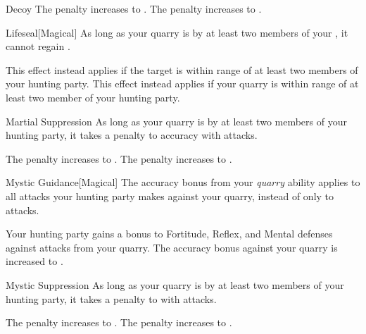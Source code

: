 {\begin{freeability}{Decoy}
                \rankline
                 The penalty increases to .
                 The penalty increases to .
            \end{freeability}

            \begin{freeability}{Lifeseal}[Magical]
                As long as your quarry is  by at least two members of your , it cannot regain .

                \rankline
                 This effect instead applies if the target is within \rngmed range of at least two members of your hunting party.
                 This effect instead applies if your quarry is within \rnglong range of at least two member of your hunting party.
            \end{freeability}

            \begin{freeability}{Martial Suppression}
                As long as your quarry is  by at least two members of your hunting party, it takes a  penalty to accuracy with  attacks.

                \rankline
                 The penalty increases to .
                 The penalty increases to .
            \end{freeability}

            \begin{freeability}{Mystic Guidance}[Magical]
                The accuracy bonus from your \textit{quarry} ability applies to all attacks your hunting party makes against your quarry, instead of only to  attacks.

                \rankline
                 Your hunting party gains a  bonus to Fortitude, Reflex, and Mental defenses against attacks from your quarry.
                 The accuracy bonus against your quarry is increased to .
            \end{freeability}

            \begin{freeability}{Mystic Suppression}
                As long as your quarry is  by at least two members of your hunting party, it takes a  penalty to  with  attacks.

                \rankline
                 The penalty increases to . 
                 The penalty increases to .
            \end{freeability}

}
